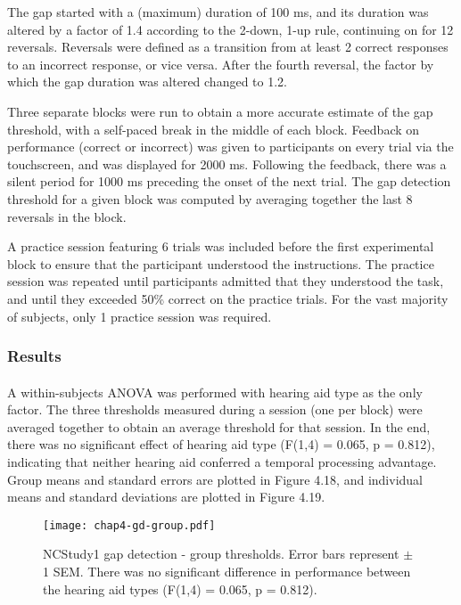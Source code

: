 The gap started with a (maximum) duration of 100 ms, and its duration was altered by a factor of 1.4 according to the 2-down, 1-up rule, continuing on for 12 reversals.  Reversals were defined as a transition from at least 2 correct responses to an incorrect response, or vice versa.  After the fourth reversal, the factor by which the gap duration was altered changed to 1.2.

Three separate blocks were run to obtain a more accurate estimate of the gap threshold, with a self-paced break in the middle of each block.  Feedback on performance (correct or incorrect) was given to participants on every trial via the touchscreen, and was displayed for 2000 ms.  Following the feedback, there was a silent period for 1000 ms preceding the onset of the next trial.  The gap detection threshold for a given block was computed by averaging together the last 8 reversals in the block.

A practice session featuring 6 trials was included before the first experimental block to ensure that the participant understood the instructions.  The practice session was repeated until participants admitted that they understood the task, and until they exceeded 50\% correct on the practice trials.  For the vast majority of subjects, only 1 practice session was required.
\subsubsection{Results}
\paragraph{}A within-subjects ANOVA was performed with hearing aid type as the only factor.  The three thresholds measured during a session (one per block) were averaged together to obtain an average threshold for that session.  In the end, there was no significant effect of hearing aid type (F(1,4) = 0.065, p = 0.812), indicating that neither hearing aid conferred a temporal processing advantage.  Group means and standard errors are plotted in Figure 4.18, and individual means and standard deviations are plotted in Figure 4.19.

\begin{figure}[htp]
\begin{center}
\texttt{[image: chap4-gd-group.pdf]} \\
\caption[NCStudy1 gap detection - group thresholds]{NCStudy1 gap detection - group thresholds.  Error bars represent $\pm$ 1 SEM.  There was no significant difference in performance between the hearing aid types (F(1,4) = 0.065, p = 0.812).}
\label{ch4-gd-group}
\end{center}
\end{figure}

